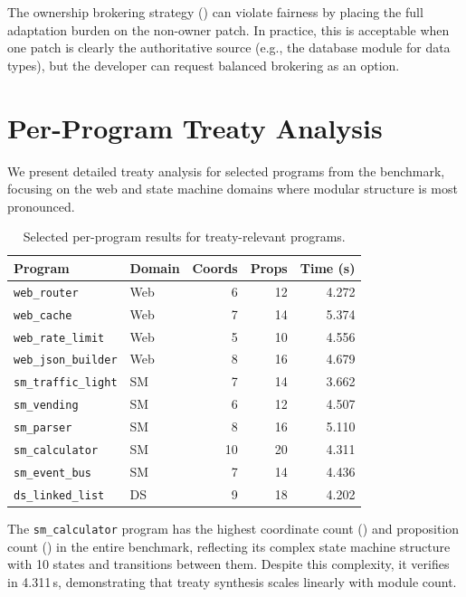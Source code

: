 \documentclass[11pt]{article}
\begin{document}
The ownership brokering strategy () can violate
fairness by placing the full adaptation burden on the non-owner
patch.  In practice, this is acceptable when one patch is clearly
the authoritative source (e.g., the database module for data types),
but the developer can request balanced brokering as an option.

\section{Per-Program Treaty Analysis}\label{sec:per-program}

We present detailed treaty analysis for selected programs from the
benchmark, focusing on the web and state machine domains where
modular structure is most pronounced.

\begin{table}[H]
\centering
\caption{Selected per-program results for treaty-relevant
  programs.}\label{tab:per-program}
\small
\begin{tabular}{@{}l l r r r@{}}
\toprule
\textbf{Program} & \textbf{Domain} & \textbf{Coords}
  & \textbf{Props} & \textbf{Time (s)} \\
\midrule
\texttt{web\_router}       & Web & 6  & 12 & 4.272 \\
\texttt{web\_cache}        & Web & 7  & 14 & 5.374 \\
\texttt{web\_rate\_limit}  & Web & 5  & 10 & 4.556 \\
\texttt{web\_json\_builder}& Web & 8  & 16 & 4.679 \\
\texttt{sm\_traffic\_light}& SM  & 7  & 14 & 3.662 \\
\texttt{sm\_vending}       & SM  & 6  & 12 & 4.507 \\
\texttt{sm\_parser}        & SM  & 8  & 16 & 5.110 \\
\texttt{sm\_calculator}    & SM  & 10 & 20 & 4.311 \\
\texttt{sm\_event\_bus}    & SM  & 7  & 14 & 4.436 \\
\texttt{ds\_linked\_list}  & DS  & 9  & 18 & 4.202 \\
\bottomrule
\end{tabular}
\end{table}

The \texttt{sm\_calculator} program has the highest coordinate count
(\expCoordsMax{}) and proposition count (\expPropsMax{}) in the entire
benchmark, reflecting its complex state machine structure with 10
states and transitions between them.  Despite this complexity, it
verifies in 4.311\,s, demonstrating that treaty synthesis scales
linearly with module count.
\end{document}
